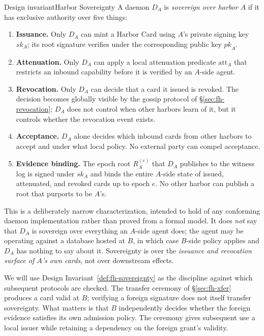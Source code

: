 \documentclass[11pt,a4paper]{article}
\theoremstyle{definition}
\theoremstyle{remark}
\begin{document}
\begin{pdclaim}{Design invariant}{Harbor Sovereignty}
\setlength{\parskip}{4pt plus 1pt}
\label{def:fh-sovereignty}
A daemon $D_A$ is \emph{sovereign over harbor $A$} if it has exclusive authority over five things:
\begin{enumerate}[nosep]
\item \textbf{Issuance.} Only $D_A$ can mint a Harbor Card using $A$'s private signing key $\mathit{sk}_A$; its root signature verifies under the corresponding public key $\mathit{pk}_A$.
\item \textbf{Attenuation.} Only $D_A$ can apply a local attenuation predicate $\mathrm{att}_A$ that restricts an inbound capability before it is verified by an $A$-side agent.
\item \textbf{Revocation.} Only $D_A$ can decide that a card it issued is revoked. The decision becomes globally visible by the gossip protocol of \S\ref{sec:fh-revocation}; $D_A$ does not control when other harbors learn of it, but it controls whether the revocation event exists.
\item \textbf{Acceptance.} $D_A$ alone decides which inbound cards from other harbors to accept and under what local policy. No external party can compel acceptance.
\item \textbf{Evidence binding.} The epoch root $R_A^{(e)}$ that $D_A$ publishes to the witness log is signed under $\mathit{sk}_A$ and binds the entire $A$-side state of issued, attenuated, and revoked cards up to epoch $e$. No other harbor can publish a root that purports to be $A$'s.
\end{enumerate}
This is a deliberately narrow characterization, intended to hold of any conforming daemon implementation rather than proved from a formal model. It does \emph{not} say that $D_A$ is sovereign over everything an $A$-side agent does; the agent may be operating against a database hosted at $B$, in which case $B$-side policy applies and $D_A$ has nothing to say about it. Sovereignty is over the \emph{issuance and revocation surface of $A$'s own cards}, not over downstream effects.
\end{pdclaim}
We will use Design Invariant~\ref{def:fh-sovereignty} as the discipline against which subsequent protocols are checked. The transfer ceremony of \S\ref{sec:fh-xfer} produces a card valid at $B$; verifying a foreign signature does not itself transfer sovereignty. What
matters is that $B$ independently decides whether the foreign evidence satisfies
its own admission policy. The ceremony gives subsequent use a local issuer
while retaining a dependency on the foreign grant's validity.
\end{document}

